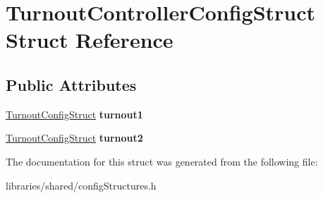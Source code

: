 \hypertarget{struct_turnout_controller_config_struct}{}\section{Turnout\+Controller\+Config\+Struct Struct Reference}
\label{struct_turnout_controller_config_struct}
\subsection*{Public Attributes}
\begin{DoxyCompactItemize}
\item 
\mbox{\label{struct_turnout_controller_config_struct_a68a2fe7bb98f3ac416dded04151f9db3}} 
\hyperlink{struct_turnout_config_struct}{Turnout\+Config\+Struct} {\bfseries turnout1}
\item 
\mbox{\label{struct_turnout_controller_config_struct_a459fe1a44c9da68318979e1fb69bb4fe}} 
\hyperlink{struct_turnout_config_struct}{Turnout\+Config\+Struct} {\bfseries turnout2}
\end{DoxyCompactItemize}


The documentation for this struct was generated from the following file\+:\begin{DoxyCompactItemize}
\item 
libraries/shared/config\+Structures.\+h\end{DoxyCompactItemize}
